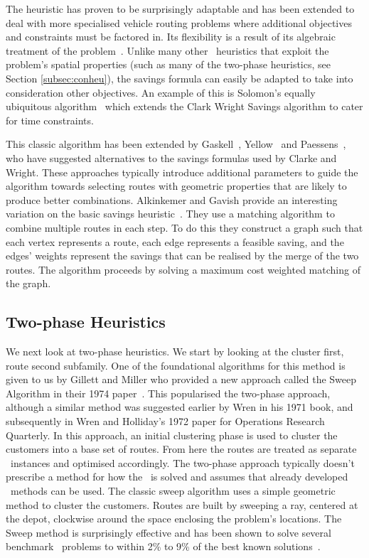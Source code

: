 The heuristic has proven to be surprisingly adaptable and has been extended to deal with more specialised vehicle routing problems where additional objectives and constraints must be factored in. Its flexibility is a result of its algebraic treatment of the problem~\cite{Laporte:1999}. Unlike many other \VRP\ heuristics that exploit the problem's spatial properties (such as many of the two-phase heuristics, see Section \ref{subsec:conheu}), the savings formula can easily be adapted to take into consideration other objectives. An example of this is Solomon's equally ubiquitous algorithm~\cite{Solomon:1987} which extends the Clark Wright Savings algorithm to cater for time constraints. 

This classic algorithm has been extended by Gaskell~\cite{Gaskell:1967}, Yellow~\cite{Yellow:1970} and Paessens~\cite{Paessens:1988}, who have suggested alternatives to the savings formulas used by Clarke and Wright. These approaches typically introduce additional parameters to guide the algorithm towards selecting routes with geometric properties that are likely to produce better combinations. Alkinkemer and Gavish provide an interesting variation on the basic savings heuristic~\cite{AG:1991}. They use a matching algorithm to combine multiple routes in each step. To do this they construct a graph such that each vertex represents a route, each edge represents a feasible saving, and the edges' weights represent the savings that can be realised by the merge of the two routes. The algorithm proceeds by solving a maximum cost weighted matching of the graph.

\subsection{Two-phase Heuristics}
\label{sec:tph}

We next look at two-phase heuristics. We start by looking at the cluster first, route second subfamily. One of the foundational algorithms for this method is given to us by Gillett and Miller who provided a new approach called the Sweep Algorithm in their 1974 paper~\cite{GM:1974}. This popularised the two-phase approach, although a similar method was suggested earlier by Wren in his 1971 book, and subsequently in Wren and Holliday's 1972 paper for Operations Research Quarterly. In this approach, an initial clustering phase is used to cluster the customers into a base set of routes. From here the routes are treated as separate \TSP\ instances and optimised accordingly. The two-phase approach typically doesn't prescribe a method for how the \TSP\ is solved and assumes that already developed \TSP\ methods can be used. The classic sweep algorithm uses a simple geometric method to cluster the customers. Routes are built by sweeping a ray, centered at the depot, clockwise around the space enclosing the problem's locations. The Sweep method is surprisingly effective and has been shown to solve several benchmark \VRP\ problems to within 2\% to 9\% of the best known solutions~\cite{TV2001}.

